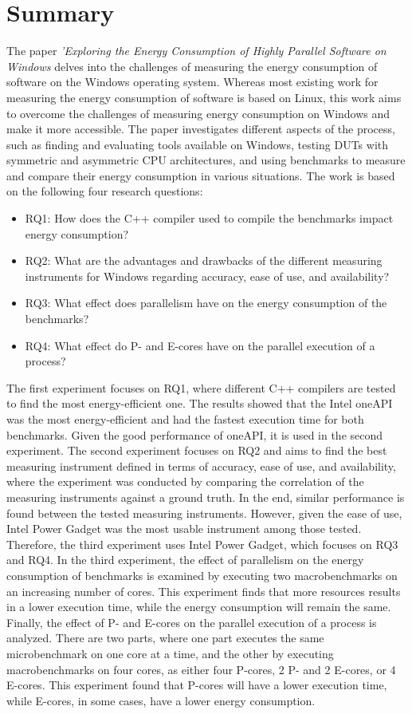 \section*{Summary}

The paper \textit{'Exploring the Energy Consumption of Highly Parallel Software on Windows} delves into the challenges of measuring the energy consumption of software on the Windows operating system. Whereas most existing work for measuring the energy consumption of software is based on Linux, this work aims to overcome the challenges of measuring energy consumption on Windows and make it more accessible. The paper investigates different aspects of the process, such as finding and evaluating tools available on Windows, testing DUTs with symmetric and asymmetric CPU architectures, and using benchmarks to measure and compare their energy consumption in various situations. The work is based on the following four research questions:

\begin{itemize}
    \item RQ1: How does the C++ compiler used to compile the benchmarks impact energy consumption?
    \item RQ2: What are the advantages and drawbacks of the different measuring instruments for Windows regarding accuracy, ease of use, and availability?
    \item RQ3: What effect does parallelism have on the energy consumption of the benchmarks?
    \item RQ4: What effect do P- and E-cores have on the parallel execution of a process?
\end{itemize}

The first experiment focuses on RQ1, where different C++ compilers are tested to find the most energy-efficient one. The results showed that the Intel oneAPI was the most energy-efficient and had the fastest execution time for both benchmarks. Given the good performance of oneAPI, it is used in the second experiment. The second experiment focuses on RQ2 and aims to find the best measuring instrument defined in terms of accuracy, ease of use, and availability, where the experiment was conducted by comparing the correlation of the measuring instruments against a ground truth. In the end, similar performance is found between the tested measuring instruments. However, given the ease of use, Intel Power Gadget was the most usable instrument among those tested. Therefore, the third experiment uses Intel Power Gadget, which focuses on RQ3 and RQ4. In the third experiment, the effect of parallelism on the energy consumption of benchmarks is examined by executing two macrobenchmarks on an increasing number of cores. This experiment finds that more resources results in a lower execution time, while the energy consumption will remain the same. Finally, the effect of P- and E-cores on the parallel execution of a process is analyzed. There are two parts, where one part executes the same microbenchmark on one core at a time, and the other by executing macrobenchmarks on four cores, as either four P-cores, 2 P- and 2 E-cores, or 4 E-cores. This experiment found that P-cores will have a lower execution time, while E-cores, in some cases, have a lower energy consumption.

